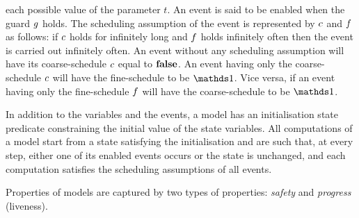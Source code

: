 each possible value of the parameter $t$.  An event is said to be
enabled when the guard $g$ holds.  The scheduling assumption of
the event is represented by $c$ and $f$ as follows: if
$c$ holds for infinitely long and $f$ holds infinitely
often then the event is carried out infinitely often.  An event
without any scheduling assumption will have its coarse-schedule
$c$ equal to $\mathbf{false}$.  An event having only the
coarse-schedule $c$ will have the fine-schedule to be $\one$.
Vice versa, if an event having only the fine-schedule $f$ will
have the coarse-schedule to be $\one$.%

In addition to the variables and the events, a model has an
initialisation state predicate \init constraining the initial value of
the state variables.
All computations of a model start from a state satisfying the
initialisation and are such that, at every step, either one of its
enabled events occurs or the state is unchanged, and each computation
satisfies the scheduling assumptions of all events.

Properties of \unitb models are captured by two types of properties:
\emph{safety} and \emph{progress} (liveness).

